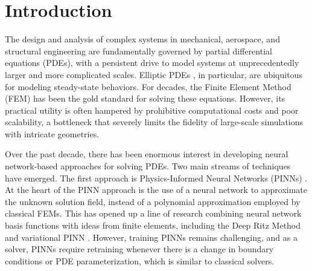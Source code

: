 \documentclass[preprint,11pt]{elsarticle}
\theoremstyle{plain}
\begin{document}

\section{Introduction}
The design and analysis of complex systems in mechanical, aerospace, and structural engineering \cite{bullo2019geometric, leng2024multidisciplinary, bauchau2009structural, umer2025approximate, stepinski2013advanced} are fundamentally governed by partial differential equations (PDEs), with a persistent drive to model systems at unprecedentedly larger and more complicated scales. Elliptic PDEs \cite{gilbarg1977elliptic}, in particular, are ubiquitous for modeling steady-state behaviors. For decades, the Finite Element Method (FEM) \cite{zienkiewicz2005finite, huebner2001finite} has been the gold standard for solving these equations. However, its practical utility is often hampered by prohibitive computational costs and poor scalability, a bottleneck that severely limits the fidelity of large-scale simulations with intricate geometries.

Over the past decade, there has been enormous interest in developing neural network-based approaches for solving PDEs. Two main streams of techniques have emerged. The first approach is Physics-Informed Neural Networks (PINNs) \cite{raissi2019physics}. At the heart of the PINN approach is the use of a neural network to approximate the unknown solution field, instead of a polynomial approximation employed by classical FEMs. This has opened up a line of research combining neural network basis functions with ideas from finite elements, including the Deep Ritz Method  \cite{yu2018deep} and variational PINN \cite{kharazmi2019variational}. However, training PINNs remains challenging, and as a solver, PINNs require retraining whenever there is a change in boundary conditions or PDE parameterization, which is similar to classical solvers.
\end{document}
